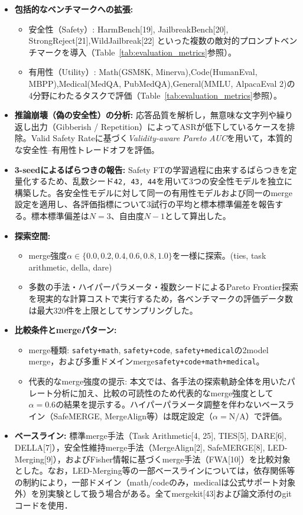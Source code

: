 \documentclass{article}
\begin{document}
\begin{itemize}
    \item \textbf{包括的なベンチマークへの拡張:}
    \begin{itemize}
        \item 安全性（Safety）:
        HarmBench[19], JailbreakBench[20], StrongReject[21],WildJailbreak[22] といった複数の敵対的プロンプトベンチマークを導入（Table~\ref{tab:evaluation_metrics}参照）。
        \item 有用性（Utility）:
        Math(GSM8K, Minerva),Code(HumanEval, MBPP),Medical(MedQA, PubMedQA),General(MMLU, AlpacaEval 2)の4分野にわたるタスクで評価（Table~\ref{tab:evaluation_metrics}参照）。
    \end{itemize}
    \item \textbf{推論崩壊（偽の安全性）の分析:}
    応答品質を解析し，無意味な文字列や繰り返し出力（Gibberish / Repetition）によってASRが低下しているケースを排除。Valid Safety Rateに基づく\textit{Validity-aware Pareto AUC}を用いて，本質的な安全性--有用性トレードオフを評価。
    \item \textbf{3-seedによるばらつきの報告:}
    Safety FTの学習過程に由来するばらつきを定量化するため、乱数シード\texttt{42, 43, 44}を用いて3つの安全性モデルを独立に構築した。各安全性モデルに対して同一の有用性モデルおよび同一のmerge設定を適用し、各評価指標について3試行の平均と標本標準偏差を報告する。標本標準偏差は\(N=3\)、自由度\(N-1\)として算出した。
    \item \textbf{探索空間:}
    \begin{itemize}
        \item merge強度$\alpha \in \{0.0, 0.2, 0.4, 0.6, 0.8, 1.0\}$を一様に探索。(ties, task arithmetic, della, dare)
        \item 多数の手法・ハイパーパラメータ・複数シードによるPareto Frontier探索を現実的な計算コストで実行するため，各ベンチマークの評価データ数は最大320件を上限としてサンプリングした。
    \end{itemize}
    \item \textbf{比較条件とmergeパターン:}
    \begin{itemize}
        \item merge種類:
        \texttt{safety+math},
        \texttt{safety+code},
        \texttt{safety+medical}の2model merge，および多重ドメインmerge\texttt{safety+code+math+medical}。
        \item 代表的なmerge強度の提示:
        本文では、各手法の探索軌跡全体を用いたパレート分析に加え、比較の可読性のため代表的なmerge強度として$\alpha=0.6$の結果を提示する。ハイパーパラメータ調整を伴わないベースライン（SafeMERGE, MergeAlign等）は既定設定（$\alpha=\mathrm{N/A}$）で評価。
    \end{itemize}
    \item \textbf{ベースライン:}
    標準merge手法（Task Arithmetic[4, 25], TIES[5], DARE[6], DELLA[7]），安全性維持merge手法（MergeAlign[2], SafeMERGE[8], LED-Merging[9]），およびFisher情報に基づくmerge手法（FWA[10]）を比較対象とした。なお，LED-Merging等の一部ベースラインについては，依存関係等の制約により，一部ドメイン（math/codeのみ，medicalは公式サポート対象外）を別実験として扱う場合がある。全てmergekit[43]および論文添付のgitコードを使用．
\end{itemize}
\end{document}
